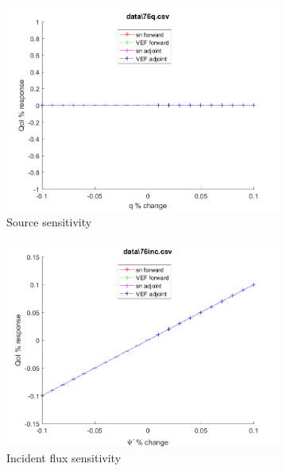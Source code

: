 \documentclass{article}
\begin{document}
\begin{figure}[H]
\label{Case76Sens}
\centering
\begin{subfigure}{.5\textwidth}
  \centering
  \includegraphics[width=.98\linewidth]{IanProposal/figures2/76qSens.png}
  \caption{Source sensitivity}
  \label{fig:sfig1}
\end{subfigure}%
\begin{subfigure}{.5\textwidth}
  \centering
  \includegraphics[width=.98\linewidth]{IanProposal/figures2/76incSens.png}
  \caption{Incident flux sensitivity}
  \label{fig:sfig4}
\end{subfigure}%
\\
\begin{subfigure}{.5\textwidth}
  \centering

\end{subfigure}
\end{figure}
\end{document}

